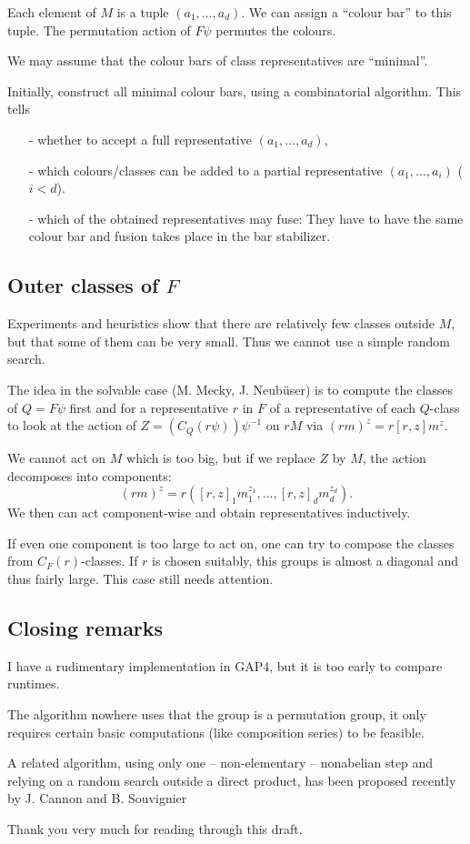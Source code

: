 \documentclass[11pt]{amsart}
\begin{document}
Each element of $M$ is a tuple $(a_1,\ldots,a_d)$. We can assign a ``colour
bar'' to this tuple. The permutation action of $F\psi$ permutes the colours.

We may assume that the colour bars of class representatives are ``minimal''.

Initially, construct all minimal colour bars, using a combinatorial
algorithm. This tells
\begin{itemize}
\item[-] whether to accept a full representative $(a_1,\ldots,a_d)$,
\item[-] which colours/classes can be added to a partial representative
$(a_1,\ldots,a_i)$ ($i<d$).
\item[-] which of the obtained representatives may fuse: They have to have
the same colour bar and fusion takes place in the bar stabilizer.
\end{itemize}

\subsection{Outer classes of $F$}
Experiments and heuristics show that there are relatively few classes
outside $M$, but that some of them can be very small. Thus we cannot use a
simple random search.

The idea in the solvable case ({\sc M. Mecky}, {\sc J. Neub\"user})
is to compute the classes of $Q=F\psi$ first
and for a representative $r$ in $F$ of a representative of each $Q$-class
to look at the action of $Z=(C_Q(r\psi))\psi^{-1}$ on $rM$ via
$(rm)^z=r[r,z]m^z$.

We cannot act on $M$ which is too big, but if we replace $Z$ by $M$, the
action decomposes into components:
\[
(rm)^z=r([r,z]_1m_1^{z_1},\ldots,[r,z]_dm_d^{z_d}).
\]
We then can act component-wise and obtain representatives inductively.

If even one component is too large to act on, one can try to compose the
classes from $C_F(r)$-classes. If $r$ is chosen suitably, this groups is
almost a diagonal and thus fairly large. This case still needs attention.

\subsection{Closing remarks}
I have a rudimentary implementation in {\sf GAP4}, but it is too early to
compare runtimes.

The algorithm nowhere uses that the group is a permutation group, it only
requires certain basic computations (like composition series) to be
feasible.

A related algorithm, using only one -- non-elementary -- nonabelian step and
relying on a random search outside a direct product, has been proposed
recently by {\sc J. Cannon} and {\sc B. Souvignier}

Thank you very much for reading through this draft.
\end{document}
